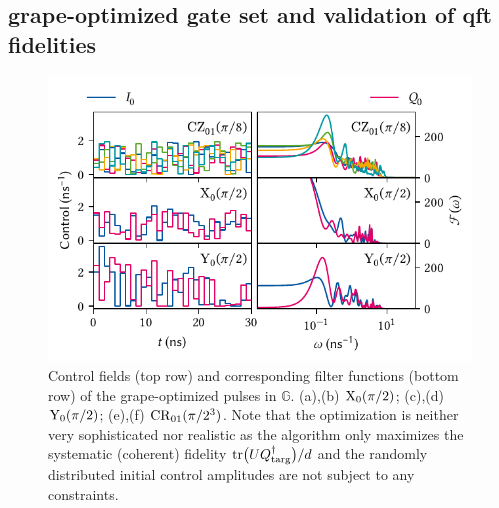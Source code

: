 \subsection{\texorpdfstring{\acrshort{grape}}{GRAPE}-optimized gate set and validation of \texorpdfstring{\acrshort{qft}}{QFT} fidelities}\label{subsec:app:ff:fidelity:qft}
\begin{figure}
    \centering
    \includegraphics{img/pdf/filter_functions/qft_atomic_pulses}
    \caption[]{
        Control fields (top row) and corresponding filter functions (bottom row) of the \acrshort{grape}-optimized pulses in $\mathbb{G}$.
        (a),(b) $\mathrm{X}_0(\pi/2)$; (c),(d) $\mathrm{Y}_0(\pi/2)$; (e),(f) $\mathrm{CR}_{01}(\pi/2^3)$.
        Note that the optimization is neither very sophisticated nor realistic as the algorithm only maximizes the systematic (coherent) fidelity $\mathrm{tr}\bigl(UQ^\dagger_{\mathrm{targ}}\bigr)/d$ and the randomly distributed initial control amplitudes are not subject to any constraints.
    }
    \label{fig:app:ff:qft:gates}
\end{figure}

